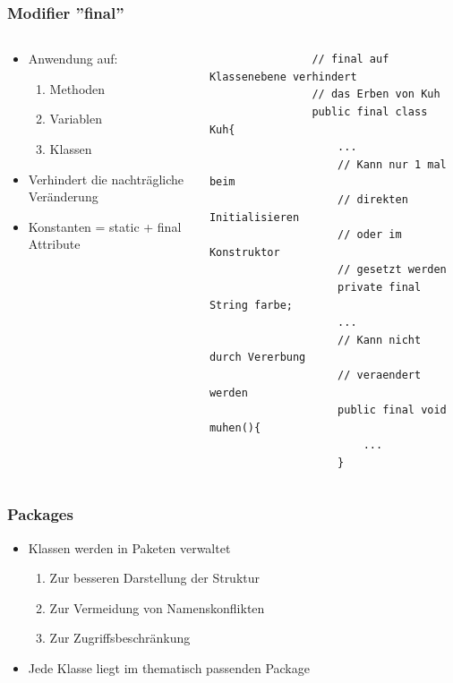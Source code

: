 \begin{frame}[fragile]
	  \frametitle{Modifier ''final''}
	  \begin{columns}
		  \begin{column}{0.5\textwidth}
			  \small
			  \begin{itemize}
			  	\item Anwendung auf:
			  	\begin{enumerate}
			  	  \item Methoden
			  	  \item Variablen
			  	  \item Klassen\\
			  	\end{enumerate}
			  	\item Verhindert die nachtr\"agliche
			  	 Ver\"anderung
			  	 \item Konstanten = static + final 
			  	 Attribute
			  \end{itemize}
		  \end{column}
		  \begin{column}{0.5\textwidth}
		  	\begin{lstlisting}
		  		// final auf Klassenebene verhindert 
		  		// das Erben von Kuh
			  	public final class Kuh{
			  		...
			  		// Kann nur 1 mal beim
			  		// direkten Initialisieren
			  		// oder im Konstruktor
			  		// gesetzt werden 
			  		private final String farbe;
			  		...
			  		// Kann nicht durch Vererbung 
			  		// veraendert werden
			  		public final void muhen(){
			  			...
			  		}
		  	\end{lstlisting}
		  \end{column}
	  \end{columns}
\end{frame}

\begin{frame}[fragile]
	  \frametitle{Packages}
	  \small
	  \begin{itemize}
	  	\item Klassen werden in Paketen verwaltet
		  	\begin{enumerate}
		  	  \item Zur besseren Darstellung der Struktur
		  	  \item Zur Vermeidung von Namenskonflikten
		  	  \item Zur Zugriffsbeschr\"ankung
		  	\end{enumerate}
		\item Jede Klasse liegt im thematisch passenden
		Package
	  \end{itemize}
\end{frame}

